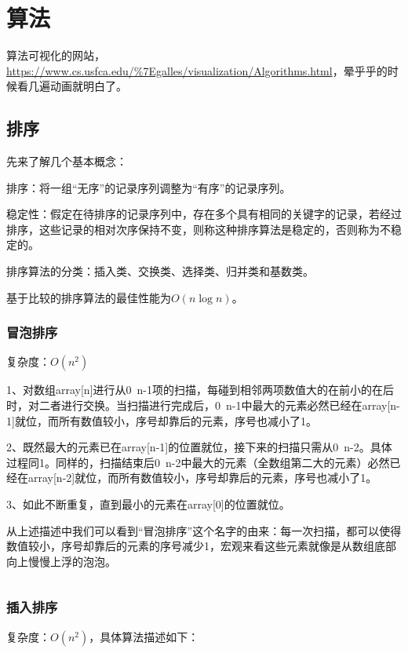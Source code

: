 \chapter{算法}

算法可视化的网站，\url{https://www.cs.usfca.edu/\%7Egalles/visualization/Algorithms.html}，晕乎乎的时候看几遍动画就明白了。

\section{排序}

先来了解几个基本概念：

排序：将一组“无序”的记录序列调整为“有序”的记录序列。

稳定性：假定在待排序的记录序列中，存在多个具有相同的关键字的记录，若经过排序，这些记录的相对次序保持不变，则称这种排序算法是稳定的，否则称为不稳定的。

排序算法的分类：插入类、交换类、选择类、归并类和基数类。

基于⽐较的排序算法的最佳性能为$ O(n\log n) $。

\subsection{冒泡排序}

复杂度：$ O(n^2) $

1、对数组array[n]进行从0~n-1项的扫描，每碰到相邻两项数值大的在前小的在后时，对二者进行交换。当扫描进行完成后，0~n-1中最大的元素必然已经在array[n-1]就位，而所有数值较小，序号却靠后的元素，序号也减小了1。

2、既然最大的元素已在array[n-1]的位置就位，接下来的扫描只需从0~n-2。具体过程同1。同样的，扫描结束后0~n-2中最大的元素（全数组第二大的元素）必然已经在array[n-2]就位，而所有数值较小，序号却靠后的元素，序号也减小了1。

3、如此不断重复，直到最小的元素在array[0]的位置就位。

从上述描述中我们可以看到“冒泡排序”这个名字的由来：每一次扫描，都可以使得数值较小，序号却靠后的元素的序号减少1，宏观来看这些元素就像是从数组底部向上慢慢上浮的泡泡。

\inputminted{c++}{code/algorithm/bubble_sort.cpp}

\subsection{插入排序}

复杂度：$ O(n^2) $，具体算法描述如下：

